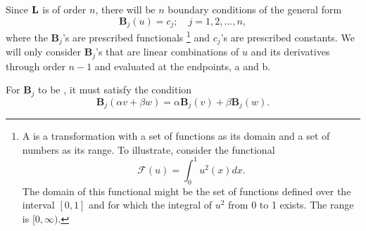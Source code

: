 	Since \(\mathrm{\bf{L}}\) is of order \(n\), there will be \(n\) boundary conditions of the general form 
\begin{equation}
	\mathbf{B}_j (u) = c_j;\quad j=1,2,\dots,n,
\end{equation}
where the \(\mathbf{B}_j\)'s are prescribed functionals \footnote{A  is a transformation with a set of functions as its domain and a set of numbers as its range. To illustrate, consider the functional 
\begin{equation}
	\mathcal{F}(u) = \int_{0}^{1} u^2(x)dx.
\end{equation}
The domain of this functional might be the set of functions defined over the interval \([0,1]\) and for which the integral of \(u^2\) from 0 to 1 exists. The range is \([0, \infty)\).
} and \(c_j\)'s are prescribed constants. We will only consider \(\mathbf{B}_j\)'s that are linear combinations of \(u\) and its derivatives through order \(n-1\) and evaluated at the endpoints, a and b. 

For \(\mathbf{B}_j\) to be , it must satisfy the condition
\begin{equation}
	\mathbf{B}_j(\alpha v + \beta w) = \alpha \mathbf{B}_j (v) + \beta \mathbf{B}_j(w).
\end{equation}